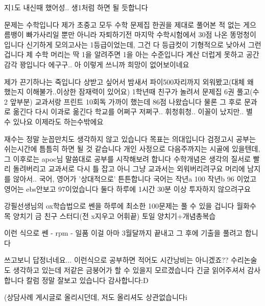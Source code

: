     지1도 내신때 했어성.. 생1처럼 하면 될 듯합니다
    \vspace{5mm}

    문제는 수학입니다
    제가 초중고 모두 수학 문제집 한권을 제대로 풀어본 적 없는 게으름뱅이 빠가사리일 뿐만 아니라
    자퇴하기전 마지막 수학시험에서 30점 나온 똥멍청이입니다
    신기하게 모의고사는 1등급이었는데, 그건 다 등급컷이 기형적으로 낮아서 그런겁니다
    제 수학 머리는 딱 1을 알려주면 1을 아는 수준입니다
    계산 더럽게 못하고 공간감각 꽝입니다
    에구구..
    아 이렇게 쓰니까 희망이 없어보이네요
    \vspace{5mm}

    제가 끈기하나는 죽입니다
    상받고 싶어서 밤새서 파이500자리까지 외워봤고(대체 왜 했는지 이해불가..이상한 잠재력이 있어요)
    1학년때 친구가 놀려서 문제집 6권 풀고(수2 앞부분) 교과서랑 프린트 10회독 가까이 했는데
    86점 나왔습니다
    물론 그 후로 문과로 옮긴다 다시 이과로 옮긴다 학교를 어쩌구 저쩌구.. 휘청휘청.. 이꼴이 났지만..
    별 수 있나요 이제라도 하는수밖에요
    \vspace{5mm}

    재수는 정말 눈꼽만치도 생각하지 않고 있습니다 목표는 의대입니다
    검정고시 공부는 쉬는시간에 틈틈히 하면 될 것 같습니다
    개인 사정으로 다음주까지는 시골에 있을텐데, 그 이후로는 apoc님 말씀대로 공부를 시작해보려 합니다
    수학개념은 생각의 질서로 빨리 돌려버리고
    교과서로 다시 틀 잡고 아니 그냥 교과서는 외워버리려구요 머리에 남지를 않아서..
    국어, 영어가 '상대적으로' 튼튼합니다 국어는 작년a 100 작년b 96 이었고 영어는 ebs안보고 97이었습니다
    둘다 하루에 1시간 30분 이상 투자하지 않으려구요
    \vspace{5mm}

    강필선생님의 ox학습법으로 쎈을 하루에 최소한 100문제는 풀 수 있을 겁니다
    월화수목 양치기
    금 친구 스터디(전 x지우고 어휘끝)
    토일 양치기+개념총복습
    \vspace{5mm}

    이런 식으로 쎈 - rpm - 일품
    이걸 아마 3월달까지 끝내고 그 후에 기출을 풀려고 합니다
    \vspace{5mm}

    쓰고보니 답정너네요... 이런식으로 공부하면 적어도 시간낭비는 아니겠죠??
    수리논술도 생각하고 있는데 저같은 금붕어가 할 수 있을지 모르겠습니다
    긴글 읽어주셔서 감사합니다 칼럼 정말 잘보고 있습니다
    감사합니다:D
    \vspace{5mm}

(상담사례 게시글로 올리시던데, 저도 올리셔도 상관없습니다^^)
\vspace{5mm}

